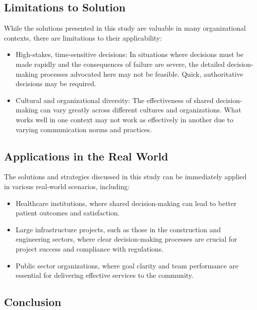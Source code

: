 \documentclass[12pt]{article}
\begin{document}
\subsection{Limitations to Solution}
While the solutions presented in this study are valuable in many organizational contexts, there are limitations to their applicability:
\begin{itemize}
  \item High-stakes, time-sensitive decisions: In situations where decisions must be made rapidly and the consequences of failure are severe, the detailed decision-making processes advocated here may not be feasible. Quick, authoritative decisions may be required.
  \item Cultural and organizational diversity: The effectiveness of shared decision-making can vary greatly across different cultures and organizations. What works well in one context may not work as effectively in another due to varying communication norms and practices.
\end{itemize}

\subsection{Applications in the Real World}
The solutions and strategies discussed in this study can be immediately applied in various real-world scenarios, including:
\begin{itemize}
  \item Healthcare institutions, where shared decision-making can lead to better patient outcomes and satisfaction.
  \item Large infrastructure projects, such as those in the construction and engineering sectors, where clear decision-making processes are crucial for project success and compliance with regulations.
  \item Public sector organizations, where goal clarity and team performance are essential for delivering effective services to the community.
\end{itemize}

\subsection{Conclusion}
\end{document}
